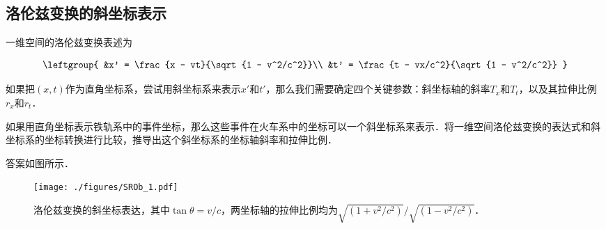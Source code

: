 \subsection{洛伦兹变换的斜坐标表示}

一维空间的洛伦兹变换表述为

\begin{equation}\label{SROb_eq1}
\leftgroup{
&x' = \frac{x - vt}{\sqrt{1 - v^2/c^2}}\\
&t' = \frac{t - vx/c^2}{\sqrt{1 - v^2/c^2}}
}
\end{equation}

如果把$(x,t)$作为直角坐标系，尝试用斜坐标系来表示$x'$和$t'$，那么我们需要确定四个关键参数：斜坐标轴的斜率$T_x$和$T_t$，以及其拉伸比例$r_x$和$r_t$．

\begin{exercise}{}

如果用直角坐标表示铁轨系中的事件坐标，那么这些事件在火车系中的坐标可以一个斜坐标系来表示．将一维空间洛伦兹变换的表达式和斜坐标系的坐标转换进行比较，推导出这个斜坐标系的坐标轴斜率和拉伸比例．

\end{exercise}

答案如图所示．

\begin{figure}[ht]
\centering
\texttt{[image: ./figures/SROb\_1.pdf]}
\caption{洛伦兹变换的斜坐标表达，其中$\tan{\theta}=v/c$，两坐标轴的拉伸比例均为$\sqrt{(1+v^2/c^2)}/\sqrt{(1-v^2/c^2)}$．} \label{SROb_fig1}
\end{figure}




